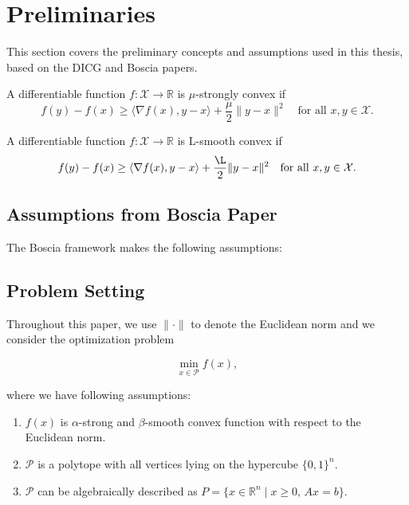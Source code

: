 \chapter{Preliminaries\label{cha:chapter2}}
This section covers the preliminary concepts and assumptions used in this thesis, based on the DICG and Boscia papers.

\begin{definition}
	A differentiable function \( f : \mathcal{X} \to \mathbb{R} \) is \( \mu\)-strongly convex if 
	\[
	f(y) - f(x) \geq \langle \nabla f(x), y - x \rangle + \frac{\mu}{2} \| y - x \|^2 \quad \text{for all } x, y \in \mathcal{X}.
	\]
\end{definition}

\begin{definition}
	A differentiable function \( f : \mathcal{X} \to \mathbb{R} \) is  L-smooth convex if 
	\[
	f(y) - f(x) \geq \langle \nabla f(x), y - x \rangle + \frac{\L}{2} \| y - x \|^2 \quad \text{for all } x, y \in \mathcal{X}.
	\]
\end{definition}


\section{Assumptions from Boscia Paper \label{sec:assum}}
The Boscia framework makes the following assumptions:


\section{Problem Setting\label{sec:problem}}
Throughout this paper, we use \( \| \cdot \| \) to denote the Euclidean norm and we consider the optimization problem

\[
\min_{x \in \mathcal{P}} f(x),
\]

where we have following assumptions:\
\begin{enumerate}
	\item \(f(x)\) is \(\alpha\)-strong and \(\beta\)-smooth convex function with respect to the Euclidean norm.
	\item \(\mathcal{P}\) is a polytope with all vertices lying on the hypercube \( \{0, 1\}^n \).
	\item \(\mathcal{P}\) can be algebraically described as \(P = \{ x \in \mathbb{R}^n \mid x \geq 0, \, Ax = b \}. \)
\end{enumerate}
